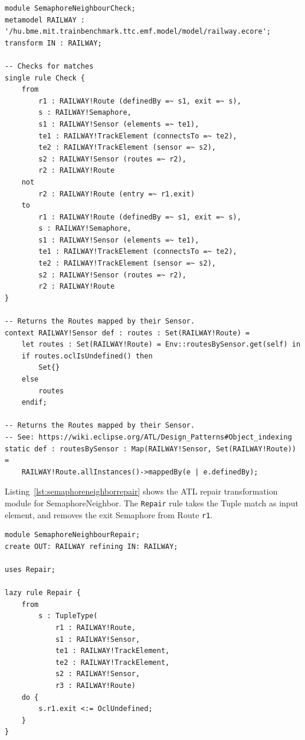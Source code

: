 \documentclass[submission,copyright,creativecommons]{eptcs}
\begin{document}
\lstset{language=simplegt}
\begin{lstlisting}[float=htb, caption={SemaphoreNeighborCheck transformation module in SimpleGT}, label=lst:semaphoreneighborcheck, captionpos=b, frame=tb, belowskip=-10pt]
module SemaphoreNeighbourCheck;
metamodel RAILWAY : '/hu.bme.mit.trainbenchmark.ttc.emf.model/model/railway.ecore';
transform IN : RAILWAY;

-- Checks for matches
single rule Check {
	from
		r1 : RAILWAY!Route (definedBy =~ s1, exit =~ s),
		s : RAILWAY!Semaphore,
		s1 : RAILWAY!Sensor (elements =~ te1),
		te1 : RAILWAY!TrackElement (connectsTo =~ te2),
		te2 : RAILWAY!TrackElement (sensor =~ s2),
		s2 : RAILWAY!Sensor (routes =~ r2),
		r2 : RAILWAY!Route
	not
		r2 : RAILWAY!Route (entry =~ r1.exit)
	to
		r1 : RAILWAY!Route (definedBy =~ s1, exit =~ s),
		s : RAILWAY!Semaphore,
		s1 : RAILWAY!Sensor (elements =~ te1),
		te1 : RAILWAY!TrackElement (connectsTo =~ te2),
		te2 : RAILWAY!TrackElement (sensor =~ s2),
		s2 : RAILWAY!Sensor (routes =~ r2),
		r2 : RAILWAY!Route
}

-- Returns the Routes mapped by their Sensor.
context RAILWAY!Sensor def : routes : Set(RAILWAY!Route) =
	let routes : Set(RAILWAY!Route) = Env::routesBySensor.get(self) in
	if routes.oclIsUndefined() then
		Set{}
	else
		routes
	endif;

-- Returns the Routes mapped by their Sensor.
-- See: https://wiki.eclipse.org/ATL/Design_Patterns#Object_indexing
static def : routesBySensor : Map(RAILWAY!Sensor, Set(RAILWAY!Route)) =
	RAILWAY!Route.allInstances()->mappedBy(e | e.definedBy);
\end{lstlisting}

Listing~\ref{lst:semaphoreneighborrepair} shows the ATL repair transformation module for SemaphoreNeighbor. The \texttt{Repair} rule takes the Tuple match as input element, and removes the exit Semaphore from Route \texttt{r1}.

\lstset{language=atl}
\begin{lstlisting}[float=htb, caption={SemaphoreNeighbor repair transformation module in ATL}, label=lst:semaphoreneighborrepair, captionpos=b, frame=tb, belowskip=-10pt]
module SemaphoreNeighbourRepair;
create OUT: RAILWAY refining IN: RAILWAY;

uses Repair;

lazy rule Repair {
	from
		s : TupleType(
			r1 : RAILWAY!Route,
			s1 : RAILWAY!Sensor, 
			te1 : RAILWAY!TrackElement, 
			te2 : RAILWAY!TrackElement, 
			s2 : RAILWAY!Sensor,
			r3 : RAILWAY!Route)
	do {
		s.r1.exit <:= OclUndefined;
	}
}
\end{lstlisting}
\end{document}
